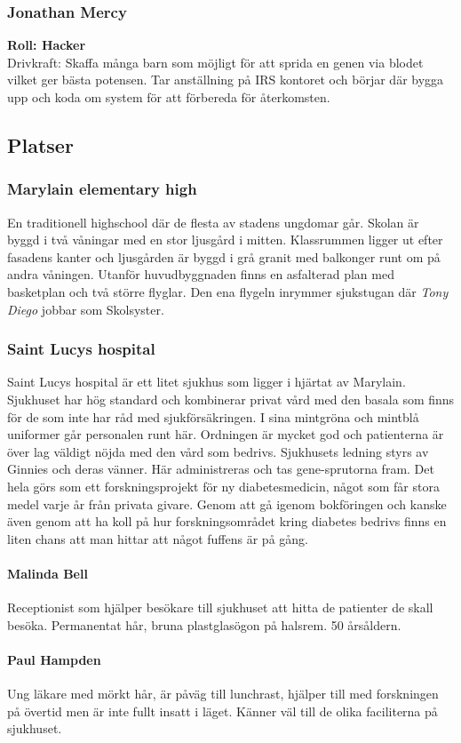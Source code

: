 \documentclass[a5paper,10pt]{report}
\begin{document}
\subsubsection{Jonathan Mercy}
\textbf{Roll: Hacker}\\
Drivkraft: Skaffa många barn som möjligt för att sprida en genen via blodet vilket ger bästa potensen. Tar anställning på IRS kontoret och börjar där bygga upp och koda om system för att förbereda för återkomsten.
\subsection{Platser}
\subsubsection{Marylain elementary high}
En traditionell highschool där de flesta av stadens ungdomar går. Skolan är byggd i två våningar med en stor ljusgård i mitten. Klassrummen ligger ut efter fasadens kanter och ljusgården är byggd i grå granit med balkonger runt om på andra våningen. Utanför huvudbyggnaden finns en asfalterad plan med basketplan och två större flyglar. Den ena flygeln inrymmer sjukstugan där \textit{Tony Diego} jobbar som Skolsyster.
\subsubsection{Saint Lucys hospital}
Saint Lucys hospital är ett litet sjukhus som ligger i hjärtat av Marylain. Sjukhuset har hög standard och kombinerar privat vård med den basala som finns för de som inte har råd med sjukförsäkringen. I sina mintgröna och mintblå uniformer går personalen runt här. Ordningen är mycket god och patienterna är över lag väldigt nöjda med den vård som bedrivs. Sjukhusets ledning styrs av Ginnies och deras vänner. Här administreras och tas gene-sprutorna fram. Det hela görs som ett forskningsprojekt för ny diabetesmedicin, något som får stora medel varje år från privata givare. Genom att gå igenom bokföringen och kanske även genom att ha koll på hur forskningsområdet kring diabetes bedrivs finns en liten chans att man hittar att något fuffens är på gång.
\paragraph{Malinda Bell}
Receptionist som hjälper besökare till sjukhuset att hitta de patienter de skall besöka. Permanentat hår, bruna plastglasögon på halsrem. 50 årsåldern.
\paragraph{Paul Hampden}
Ung läkare med mörkt hår, är påväg till lunchrast, hjälper till med forskningen på övertid men är inte fullt insatt i läget. Känner väl till de olika faciliterna på sjukhuset.
\end{document}
